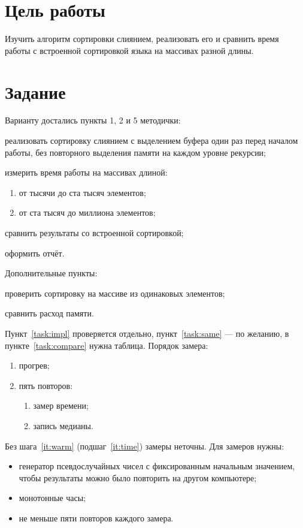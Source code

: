 \documentclass{mtuci-report}
\begin{document}
\bbtTitlePage

\section{Цель работы}
Изучить алгоритм сортировки слиянием, реализовать его и сравнить время работы с встроенной
сортировкой языка на массивах разной длины.

\section{Задание}
Варианту достались пункты 1, 2 и 5 методички:
\begin{bbttask}
  \item реализовать сортировку слиянием с выделением буфера один раз перед началом
    работы, без повторного выделения памяти на каждом уровне рекурсии;\label{task:impl}
  \item измерить время работы на массивах длиной:
    \begin{enumerate}
      \item от тысячи до ста тысяч элементов;\label{task:short}
      \item от ста тысяч до миллиона элементов;
    \end{enumerate}
  \item[5] сравнить результаты со встроенной сортировкой;\label{task:compare}
  \item оформить отчёт.
\end{bbttask}
Дополнительные пункты:
\begin{bbttask}[а]
  \item проверить сортировку на массиве из одинаковых элементов;\label{task:same}
  \item[д] сравнить расход памяти.
\end{bbttask}
Пункт~\ref{task:impl} проверяется отдельно, пункт~\ref{task:same} — по желанию,
в пункте~\ref{task:compare} нужна таблица. Порядок замера:
\begin{enumerate}
  \item прогрев;\label{it:warm}
  \item пять повторов:
    \begin{enumerate}
      \item замер времени;\label{it:time}
      \item запись медианы.
    \end{enumerate}
\end{enumerate}
Без шага~\ref{it:warm} (подшаг~\ref{it:time}) замеры неточны. Для замеров нужны:
\begin{itemize}
  \item генератор псевдослучайных чисел с фиксированным начальным значением, чтобы
    результаты можно было повторить на другом компьютере;
  \item монотонные часы;
  \item не меньше пяти повторов каждого замера.
\end{itemize}
\end{document}
